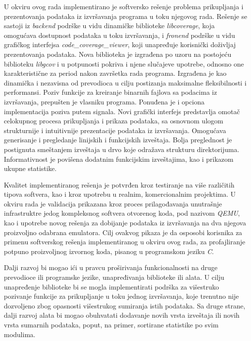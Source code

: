 \documentclass[12pt,oneside]{memoir}
\newcommand{\strano}[1]{\textit{#1}}
\begin{document}
U okviru ovog rada implementirano je softversko rešenje problema prikupljanja i prezentovanja podataka iz izvršavanja programa u toku njegovog rada. 
Rešenje se sastoji iz \strano{backend} podrške u vidu dinamičke biblioteke \strano{libcoverage}, koja omogućava dostupnost podataka u toku izvršavanja, i \strano{fronend} podrške u vidu grafičkog interfejsa \strano{code\_coverage\_viewer}, koji unapređuje korisnički doživljaj prezentovanja podataka. Nova biblioteka je izgrađena po uzoru na postojeću biblioteku \strano{libgcov} i u potpunosti pokriva i njene slučajeve upotrebe, odnosno one karakteristične za period nakon završetka rada programa. Izgrađena je kao dinamička i nezavisna od prevodioca u cilju postizanja maksimalne fleksibilnosti i performansi. Poziv funkcije za kreiranje binarnih fajlova sa podacima iz izvršavanja, prepušten je vlasniku programa. Ponuđena je i opciona implementacija poziva putem signala. Novi grafički interfejs predstavlja omotač celokupnog procesa prikupljanja i prikaza podataka, sa osnovnom ulogom strukturnije i intuitivnije prezentacije podataka iz izvršavanja. Omogućava generisanje i pregledanje linijskih i funkcijskih izveštaja. Bolja preglednost je postignuta smeštanjem izveštaja u drvo koje odražava strukturu direktorijuma. Informativnost je povišena dodatnim funkcijskim izveštajima, kao i prikazom ukupne statistike. 

Kvalitet implementiranog rešenja je potvrđen kroz testiranje na više različitih tipova softvera, kao i kroz upotrebu u realnim, komercionalnim projektima. U okviru rada je validacija prikazana kroz proces prilagođavanja unutrašnje infrastruktre jedog kompleksnog softvera otvorenog koda, pod nazivom \strano{QEMU}, kao i upotrebe novog rešenja za dobijanje podataka iz izvršavanja na dva njegova proizvoljno odabrana emulatora. Cilj ovakvog pikaza je da osposobi korisnika za primenu softverskog rešenja implementiranog u okviru ovog rada, za profajliranje potpuno proizvoljnog izvornog koda, pisanog u programskom jeziku \strano{C}.

Dalji razvoj bi mogao ići u pravcu proširivanja funkcionalnosti na druge prevodioce ili programske jezike, unapređivanja biblioteke ili alata. U cilju unapređenje biblioteke bi se mogla implementirati podrška za višestruko pozivanje funkcije za prikupljanje u toku jednog izvršavanja, koje trenutno nije dozvoljeno zbog opasnosti višestrukog sumiranja istih podataka. Sa druge strane, dalji razvoj alata bi mogao obuhvatati dodavanje novih vrsta izveštaja ili novih vrsta sumarnih podataka, poput, na primer, sortirane statistike po svim modulima.
\end{document}
